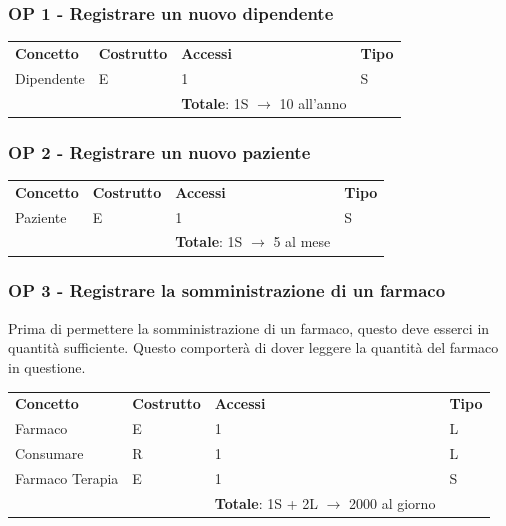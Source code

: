 \documentclass[a4paper, 12pt]{report}
\begin{document}
\subsubsection*{OP 1 - Registrare un nuovo dipendente}
\renewcommand{\arraystretch}{1.2}
\begin{tabularx}{\textwidth}{XlXl}
        \rowcolor{seaGreen}
        \textbf{Concetto} & \textbf{Costrutto} & \textbf{Accessi} & \textbf{Tipo} \\
        Dipendente & E & 1 & S \\
        \rowcolor{seaGreen}
         &  & \textbf{Totale}: 1S $\rightarrow$ 10 all'anno & \\
\end{tabularx}

\subsubsection*{OP 2 - Registrare un nuovo paziente}
\begin{tabularx}{\textwidth}{XlXl}
        \rowcolor{seaGreen}
        \textbf{Concetto} & \textbf{Costrutto} & \textbf{Accessi} & \textbf{Tipo} \\
        Paziente & E & 1 & S \\
        \rowcolor{seaGreen}
         &  & \textbf{Totale}: 1S $\rightarrow$ 5 al mese & \\
\end{tabularx}

\subsubsection*{OP 3 - Registrare la somministrazione di un farmaco}
Prima di permettere la somministrazione di un farmaco, questo deve esserci in quantità sufficiente.
Questo comporterà di dover leggere la quantità del farmaco in questione. \\
\begin{tabularx}{\textwidth}{XlXl}
        \rowcolor{seaGreen}
        \textbf{Concetto} & \textbf{Costrutto} & \textbf{Accessi} & \textbf{Tipo} \\
        Farmaco & E & 1 & L \\
        \hline
        Consumare & R & 1 & L \\
        \hline
        Farmaco Terapia & E & 1 & S \\
        \rowcolor{seaGreen}
         &  & \textbf{Totale}: 1S + 2L $\rightarrow$ 2000 al giorno & \\
\end{tabularx}
\end{document}
